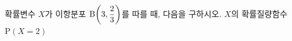 확률변수 $X$가 이항분포 $\mathrm{B}\!\left(3{,}\mkern3mu\mathopen{}\dfrac{2}{3}\right)$를 따를 때, 다음을 구하시오.
 $X$의 확률질량함수
 $\mathrm{P}(X=2)$
